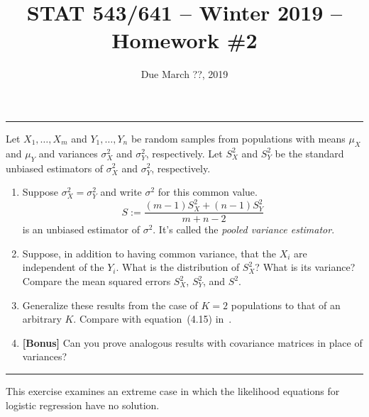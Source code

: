 \documentclass[12pt]{amsart}
\begin{document}
    \title{STAT 543/641 -- Winter 2019 -- Homework \#2}

    \author{Due March ??, 2019}
    \maketitle

    \bigskip\hrule\bigskip

    Let $X_1,\ldots,X_m$ and $Y_1,\ldots,Y_n$ be random samples from populations with 
    means $\mu_X$ and $\mu_Y$ and variances $\sigma_X^2$ and $\sigma_Y^2$, respectively.
    Let $S_X^2$ and $S_Y^2$ be the standard unbiased estimators of $\sigma_X^2$ and $\sigma_Y^2$,
    respectively.
    \begin{enumerate}\setlength\itemsep{0.5em}
    \item Suppose $\sigma_X^2 = \sigma_Y^2$ and write $\sigma^2$ for this common value.
    \[
        S := \frac{(m-1)S_X^2 + (n-1)S_Y^2}{m + n - 2}
    \]
    is an unbiased estimator of $\sigma^2$. It's called the \emph{pooled variance estimator}.

    \item Suppose, in addition to having common variance,
    that the $X_i$ are independent of the $Y_i$.
    What is the distribution of $S_X^2$?
    What is its variance?
    Compare the mean squared errors $S_X^2$, $S_Y^2$, and $S^2$.

    \item Generalize these results from the case of $K=2$ populations to that of an arbitrary $K$.
    Compare with equation~(4.15) in~\cite{ISLR}.

    \item {}\textbf{[Bonus]} Can you prove analogous results with covariance matrices in place of variances?
    \end{enumerate}
    
    \bigskip\hrule\bigskip
    \cite[Exercise 12.16]{CB}
    This exercise examines an extreme case in which the likelihood equations for logistic regression have no solution.
    
\end{document}
